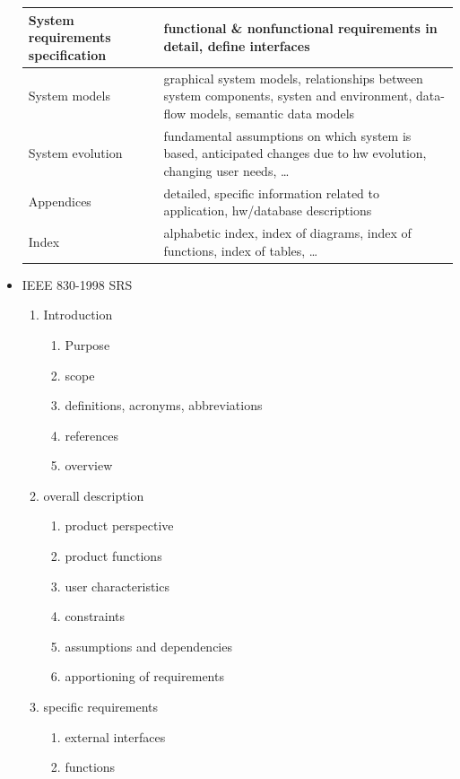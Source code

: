 \documentclass[a4paper, 10pt]{article}
\begin{document}
\begin{itemize}
\begin{tabular}{|p{3cm}|p{8cm}|}
	\hline %
	System requirements specification & functional \& nonfunctional requirements in detail, define interfaces \\
	\hline %
	System models & graphical system models, relationships between system components, systen and environment, data-flow models, semantic data models \\
	\hline %
	System evolution & fundamental assumptions on which system is based, anticipated changes due to hw evolution, changing user needs, \dots \\
	\hline %
	Appendices & detailed, specific information related to application, hw/database descriptions \\
	\hline %
	Index & alphabetic index, index of diagrams, index of functions, index of tables, \dots \\
	\hline %
	\end{tabular}
	\item IEEE 830-1998 SRS
	\begin{enumerate}
		\item Introduction
		\begin{enumerate}
			\item Purpose
			\item scope
			\item definitions, acronyms, abbreviations
			\item references
			\item overview
		\end{enumerate}
		\item overall description
		\begin{enumerate}
			\item product perspective
			\item product functions
			\item user characteristics
			\item constraints
			\item assumptions and dependencies
			\item apportioning of requirements
		\end{enumerate}
		\item specific requirements
		\begin{enumerate}
			\item external interfaces
			\item functions

\end{enumerate}
\end{enumerate}
\end{itemize}
\end{document}
